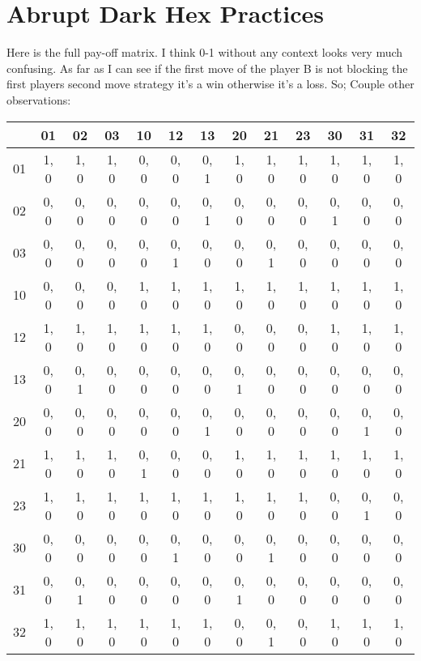 \section{Abrupt Dark Hex Practices}

Here is the full pay-off matrix. I think 0-1 without any context looks very much confusing. 
As far as I can see if the first move of the player B is not blocking the first players second 
move strategy it's a win otherwise it's a loss. So;  
Couple other observations:

\begin{tabular}{|c||c|c|c||c|c|c||c|c|c||c|c|c|}
	\hline 
	   & 01   & 02   & 03 	&  10  &  12  &   13 &   20 &   21 &   23 &   30 &   31 &   32 \\ 
	\hline 
	\hline 
	01 & 1, 0 & 1, 0 & 1, 0 & 0, 0 & 0, 0 & 0, 1 & 1, 0 & 1, 0 & 1, 0 & 1, 0 & 1, 0 & 1, 0 \\ 
	\hline 
	02 & 0, 0 & 0, 0 & 0, 0 & 0, 0 & 0, 0 & 0, 1 & 0, 0 & 0, 0 & 0, 0 & 0, 1 & 0, 0 & 0, 0 \\ 
	\hline 
	03 & 0, 0 & 0, 0 & 0, 0 & 0, 0 & 0, 1 & 0, 0 & 0, 0 & 0, 1 & 0, 0 & 0, 0 & 0, 0 & 0, 0  \\ 
	\hline 
	\hline 
	10 & 0, 0 & 0, 0 & 0, 0 & 1, 0 & 1, 0 & 1, 0 & 1, 0 & 1, 0 & 1, 0 & 1, 0 & 1, 0 & 1, 0 \\ 
	\hline 
	12 & 1, 0 & 1, 0 & 1, 0 & 1, 0 & 1, 0 & 1, 0 & 0, 0 & 0, 0 & 0, 0 & 1, 0 & 1, 0 & 1, 0 \\ 
	\hline 
	13 & 0, 0 & 0, 1 & 0, 0 & 0, 0 & 0, 0 & 0, 0 & 0, 1 & 0, 0 & 0, 0 & 0, 0 & 0, 0 & 0, 0 \\ 
	\hline 
	\hline 
	20 & 0, 0 & 0, 0 & 0, 0 & 0, 0 & 0, 0 & 0, 1 & 0, 0 & 0, 0 & 0, 0 & 0, 0 & 0, 1 & 0, 0 \\ 
	\hline 
	21 & 1, 0 & 1, 0 & 1, 0 & 0, 1 & 0, 0 & 0, 0 & 1, 0 & 1, 0 & 1, 0 & 1, 0 & 1, 0 & 1, 0 \\ 
	\hline 
	23 & 1, 0 & 1, 0 & 1, 0 & 1, 0 & 1, 0 & 1, 0 & 1, 0 & 1, 0 & 1, 0 & 0, 0 & 0, 1 & 0, 0 \\ 
	\hline 
	\hline 
	30 & 0, 0 & 0, 0 & 0, 0 & 0, 0 & 0, 1 & 0, 0 & 0, 0 & 0, 1 & 0, 0 & 0, 0 & 0, 0 & 0, 0 \\ 
	\hline 
	31 & 0, 0 & 0, 1 & 0, 0 & 0, 0 & 0, 0 & 0, 0 & 0, 1 & 0, 0 & 0, 0 & 0, 0 & 0, 0 & 0, 0 \\ 
	\hline 
	32 & 1, 0 & 1, 0 & 1, 0 & 1, 0 & 1, 0 & 1, 0 & 0, 0 & 0, 1 & 0, 0 & 1, 0 & 1, 0 & 1, 0 \\  
	\hline 
\end{tabular} 